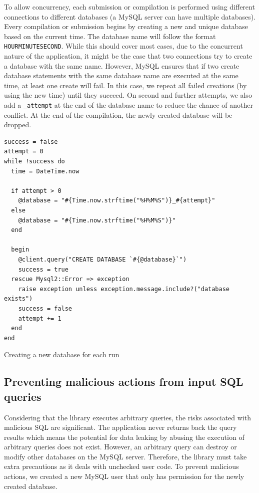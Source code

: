 To allow concurrency, each submission or compilation is performed using different connections to different databases (a MySQL server can have multiple databases). Every compilation or submission begins by creating a new and unique database based on the current time. The database name will follow the format \texttt{HOURMINUTESECOND}. While this should cover most cases, due to the concurrent nature of the application, it might be the case that two connections try to create a database with the same name. However, MySQL ensures that if two create database statements with the same database name are executed at the same time, at least one create will fail. In this case, we repeat all failed creations (by using the new time) until they succeed. On second and further attempts, we also add a \texttt{_attempt} at the end of the database name to reduce the chance of another conflict. At the end of the compilation, the newly created database will be dropped.

\begin{code}
    \begin{verbatim}
success = false
attempt = 0
while !success do
  time = DateTime.now

  if attempt > 0
    @database = "#{Time.now.strftime("%H%M%S")}_#{attempt}"
  else
    @database = "#{Time.now.strftime("%H%M%S")}"
  end

  begin
    @client.query("CREATE DATABASE `#{@database}`")
    success = true
  rescue Mysql2::Error => exception
    raise exception unless exception.message.include?("database exists")
    success = false
    attempt += 1
  end
end
\end{verbatim}
    \caption{Creating a new database for each run}
    \label{fig:creating_new_database}
\end{code}

\subsection{Preventing malicious actions from input SQL queries}

Considering that the library executes arbitrary queries, the risks associated with malicious SQL are significant. The application never returns back the query results which means the potential for data leaking by abusing the execution of arbitrary queries does not exist. However, an arbitrary query can destroy or modify other databases on the MySQL server. Therefore, the library must take extra precautions as it deals with unchecked user code. To prevent malicious actions, we created a new MySQL user that only has permission for the newly created database.

